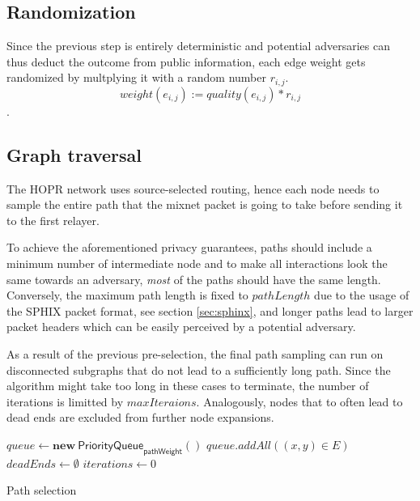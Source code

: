 \subsection{Randomization}
\label{sec:pathselection:randomization}

Since the previous step is entirely deterministic and potential adversaries can thus deduct the outcome from public information, each edge weight gets randomized by multplying it with a random number $r_{i,j}$.
$$weight(e_{i,j}) := quality(e_{i,j}) * r_{i,j}$$.

\subsection{Graph traversal}
\label{sec:pathselection:graph-traversal}

The HOPR network uses source-selected routing, hence each node needs to sample the entire path that the mixnet packet is going to take before sending it to the first relayer.

To achieve the aforementioned privacy guarantees, paths should include a minimum number of intermediate node and to make all interactions look the same towards an adversary, \textit{most} of the paths should have the same length. Conversely, the maximum path length is fixed to $pathLength$ due to the usage of the SPHIX packet format, see section \ref{sec:sphinx}, and longer paths lead to larger packet headers which can be easily perceived by a potential adversary.

As a result of the previous pre-selection, the final path sampling can run on disconnected subgraphs that do not lead to a sufficiently long path. Since the algorithm might take too long in these cases to terminate, the number of iterations is limitted by ${maxIteraions}$. Analogously, nodes that to often lead to dead ends are excluded from further node expansions.

\begin{algorithm}[H]
    \SetAlgoNoLine
    \DontPrintSemicolon
    $queue \leftarrow \mathbf{new} \ \mathsf{PriorityQueue}_{\textsf{pathWeight}}()$\;
    $queue.addAll((x,y) \in E)$\;
    $deadEnds \leftarrow \emptyset$\;
    $iterations \leftarrow 0$\;
    \;
    \caption{Path selection}
\end{algorithm}


